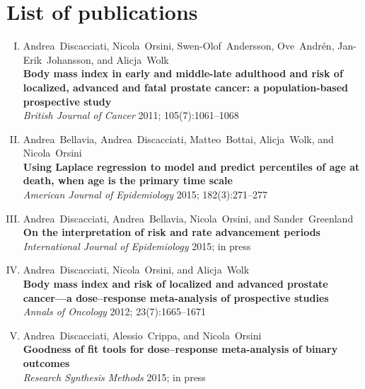 %

\chapter*{List of publications}

\begin{enumerate}[I.]
\item Andrea~Discacciati, Nicola~Orsini, Swen-Olof~Andersson, Ove~Andrén, Jan-Erik~Johansson, and Alicja~Wolk \\ \textbf{Body mass index in early and middle-late adulthood and risk of localized, advanced and fatal prostate cancer: a population-based prospective study} \\ \textit{British Journal of Cancer} 2011; 105(7):1061--1068
\item Andrea~Bellavia, Andrea~Discacciati, Matteo~Bottai, Alicja~Wolk, and Nicola~Orsini \\ \textbf{Using Laplace regression to model and predict percentiles of age at death, when age is the primary time scale} \\ \textit{American Journal of Epidemiology} 2015; 182(3):271--277
\item Andrea~Discacciati, Andrea~Bellavia, Nicola~Orsini, and Sander~Greenland \\ \textbf{On the interpretation of risk and rate advancement periods} \\ \textit{International Journal of Epidemiology} 2015; in press
\item Andrea~Discacciati, Nicola~Orsini, and Alicja~Wolk \\ \textbf{Body mass index and risk of localized and advanced prostate cancer---a dose--response meta-analysis of prospective studies} \\ \textit{Annals of Oncology} 2012; 23(7):1665--1671
\item Andrea~Discacciati, Alessio~Crippa, and Nicola~Orsini \\ \textbf{Goodness of fit tools for dose--response meta-analysis of binary outcomes} \\ \textit{Research Synthesis Methods} 2015; in press
\end{enumerate}
 \\  

